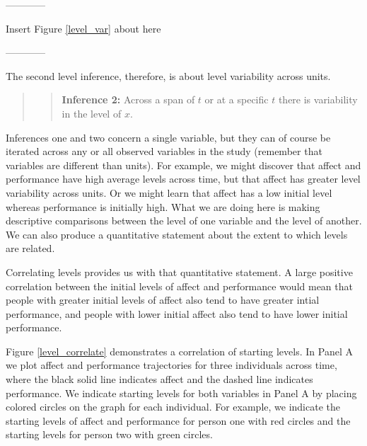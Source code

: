 \documentclass[english,,man]{apa6}
\theoremstyle{definition}
\theoremstyle{definition}
\theoremstyle{definition}
\theoremstyle{remark}
\begin{document}
\begin{center}

------------

Insert Figure \ref{level_var} about here

------------

\end{center}

\noindent The second level inference, therefore, is about level
variability across units.

\begin{quote}
\begin{quote}
\textbf{Inference 2:} Across a span of \(t\) or at a specific \(t\)
there is variability in the level of \(x\).
\end{quote}
\end{quote}

Inferences one and two concern a single variable, but they can of course
be iterated across any or all observed variables in the study (remember
that variables are different than units). For example, we might discover
that affect and performance have high average levels across time, but
that affect has greater level variability across units. Or we might
learn that affect has a low initial level whereas performance is
initially high. What we are doing here is making descriptive comparisons
between the level of one variable and the level of another. We can also
produce a quantitative statement about the extent to which levels are
related.

Correlating levels provides us with that quantitative statement. A large
positive correlation between the initial levels of affect and
performance would mean that people with greater initial levels of affect
also tend to have greater intial performance, and people with lower
initial affect also tend to have lower initial performance.

Figure \ref{level_correlate} demonstrates a correlation of starting
levels. In Panel A we plot affect and performance trajectories for three
individuals across time, where the black solid line indicates affect and
the dashed line indicates performance. We indicate starting levels for
both variables in Panel A by placing colored circles on the graph for
each individual. For example, we indicate the starting levels of affect
and performance for person one with red circles and the starting levels
for person two with green circles.
\end{document}
